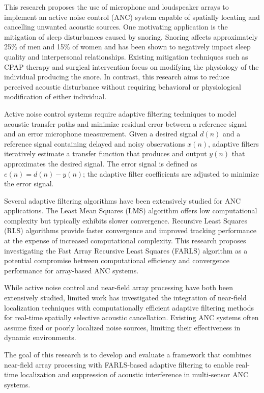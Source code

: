 This research proposes the use of microphone and loudspeaker arrays to implement an active noise control (ANC) system capable of spatially locating and cancelling unwanted acoustic sources. One motivating application is the mitigation of sleep disturbances caused by snoring. Snoring affects approximately 25\% of men and 15\% of women and has been shown to negatively impact sleep quality and interpersonal relationships. Existing mitigation techniques such as CPAP therapy and surgical intervention focus on modifying the physiology of the individual producing the snore\cite{Single_Array}. In contrast, this research aims to reduce perceived acoustic disturbance without requiring behavioral or physiological modification of either individual.

Active noise control systems require adaptive filtering techniques to model acoustic transfer paths and minimize residual error between a reference signal and an error microphone measurement. Given a desired signal $d(n)$ and a reference signal containing delayed and noisy observations $x(n)$, adaptive filters iteratively estimate a transfer function that produces and output $y(n)$ that approximates the desired signal. The error signal is defined as $e(n) = d(n)-y(n)$; the adaptive filter coefficients are adjusted to minimize the error signal.

Several adaptive filtering algorithms have been extensively studied for ANC applications. The Least Mean Squares (LMS) algorithm offers low computational complexity but typically exhibits slower convergence. Recursive Least Squares (RLS) algorithms provide faster convergence and improved tracking performance at the expense of increased computational complexity. This research proposes investigating the Fast Array Recursive Least Squares (FARLS) algorithm as a potential compromise between computational efficiency and convergence performance for array-based ANC systems.

While active noise control and near-field array processing have both been extensively studied, limited work has investigated the integration of near-field localization techniques with computationally efficient adaptive filtering methods for real-time spatially selective acoustic cancellation. Existing ANC systems often assume fixed or poorly localized noise sources, limiting their effectiveness in dynamic environments\cite{RT_exp_ANC}.

The goal of this research is to develop and evaluate a framework that combines near-field array processing with FARLS-based adaptive filtering to enable real-time localization and suppression of acoustic interference in multi-sensor ANC systems.

